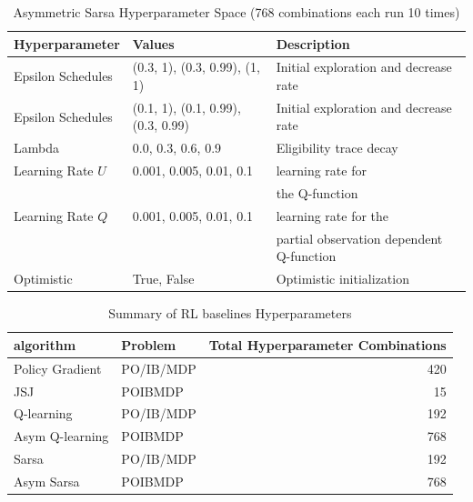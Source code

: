 \begin{table}
\centering
\small
\caption{Asymmetric Sarsa Hyperparameter Space (768 combinations each run 10 times)}\label{tab:hp-sarsa}
\begin{tabular}{lll}
\toprule
\textbf{Hyperparameter} & \textbf{Values} & \textbf{Description} \\
\midrule
Epsilon Schedules & (0.3, 1), (0.3, 0.99), (1, 1) & Initial exploration and decrease rate \\
Epsilon Schedules & (0.1, 1), (0.1, 0.99), (0.3, 0.99) & Initial exploration and decrease rate \\
Lambda & 0.0, 0.3, 0.6, 0.9 & Eligibility trace decay \\
Learning Rate $U$ & 0.001, 0.005, 0.01, 0.1 & learning rate for \\
 & & the Q-function \\
Learning Rate $Q$ & 0.001, 0.005, 0.01, 0.1 & learning rate for the \\
 & & partial observation dependent Q-function \\
Optimistic & True, False & Optimistic initialization \\
\bottomrule
\end{tabular}
\end{table}

\begin{table}
    \centering
    \caption{Summary of RL baselines Hyperparameters}
    \begin{tabular}{llr}
    \toprule
    \textbf{algorithm} & \textbf{Problem} & \textbf{Total Hyperparameter Combinations} \\
    \midrule
    Policy Gradient & PO/IB/MDP & 420 \\
    JSJ & POIBMDP & 15 \\
    Q-learning & PO/IB/MDP & 192 \\
    Asym Q-learning & POIBMDP & 768 \\
    Sarsa & PO/IB/MDP & 192 \\
    Asym Sarsa & POIBMDP & 768 \\
    \bottomrule
    \end{tabular}
    \end{table}


